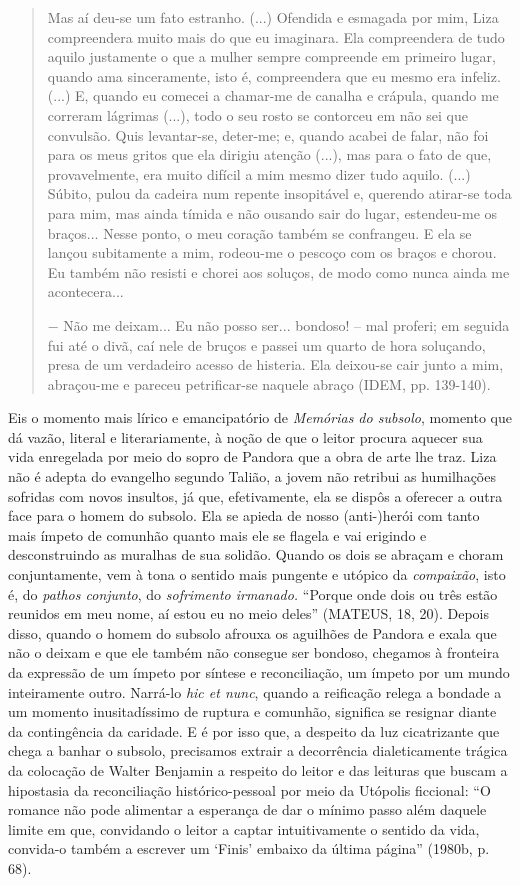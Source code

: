 \begin{quote}
Mas aí deu-se um fato estranho. (...) Ofendida e esmagada por mim, Liza
compreendera muito mais do que eu imaginara. Ela compreendera de tudo
aquilo justamente o que a mulher sempre compreende em primeiro lugar,
quando ama sinceramente, isto é, compreendera que eu mesmo era infeliz.
(...) E, quando eu comecei a chamar-me de canalha e crápula, quando me
correram lágrimas (...), todo o seu rosto se contorceu em não sei que
convulsão. Quis levantar-se, deter-me; e, quando acabei de falar, não
foi para os meus gritos que ela dirigiu atenção (...), mas para o fato
de que, provavelmente, era muito difícil a mim mesmo dizer tudo aquilo.
(...) Súbito, pulou da cadeira num repente insopitável e, querendo
atirar-se toda para mim, mas ainda tímida e não ousando sair do lugar,
estendeu-me os braços... Nesse ponto, o meu coração também se
confrangeu. E ela se lançou subitamente a mim, rodeou-me o pescoço com
os braços e chorou. Eu também não resisti e chorei aos soluços, de modo
como nunca ainda me acontecera...

− Não me deixam... Eu não posso ser... bondoso! -- mal proferi; em
seguida fui até o divã, caí nele de bruços e passei um quarto de hora
soluçando, presa de um verdadeiro acesso de histeria. Ela deixou-se cair
junto a mim, abraçou-me e pareceu petrificar-se naquele abraço (IDEM,
pp. 139-140).
\end{quote}

Eis o momento mais lírico e emancipatório de \emph{Memórias do subsolo},
momento que dá vazão, literal e literariamente, à noção de que o leitor
procura aquecer sua vida enregelada por meio do sopro de Pandora que a
obra de arte lhe traz. Liza não é adepta do evangelho segundo Talião, a
jovem não retribui as humilhações sofridas com novos insultos, já que,
efetivamente, ela se dispôs a oferecer a outra face para o homem do
subsolo. Ela se apieda de nosso (anti-)herói com tanto mais ímpeto de
comunhão quanto mais ele se flagela e vai erigindo e desconstruindo as
muralhas de sua solidão. Quando os dois se abraçam e choram
conjuntamente, vem à tona o sentido mais pungente e utópico da
\emph{compaixão}, isto é, do \emph{pathos conjunto}, do \emph{sofrimento
irmanado.} ``Porque onde dois ou três estão reunidos em meu nome, aí
estou eu no meio deles'' (MATEUS, 18, 20). Depois disso, quando o homem
do subsolo afrouxa os aguilhões de Pandora e exala que não o deixam e
que ele também não consegue ser bondoso, chegamos à fronteira da
expressão de um ímpeto por síntese e reconciliação, um ímpeto por um
mundo inteiramente outro. Narrá-lo \emph{hic et nunc}, quando a
reificação relega a bondade a um momento inusitadíssimo de ruptura e
comunhão, significa se resignar diante da contingência da caridade. E é
por isso que, a despeito da luz cicatrizante que chega a banhar o
subsolo, precisamos extrair a decorrência dialeticamente trágica da
colocação de Walter Benjamin a respeito do leitor e das leituras que
buscam a hipostasia da reconciliação histórico-pessoal por meio da
Utópolis ficcional: ``O romance não pode alimentar a esperança de dar o
mínimo passo além daquele limite em que, convidando o leitor a captar
intuitivamente o sentido da vida, convida-o também a escrever um `Finis'
embaixo da última página'' (1980b, p. 68).

